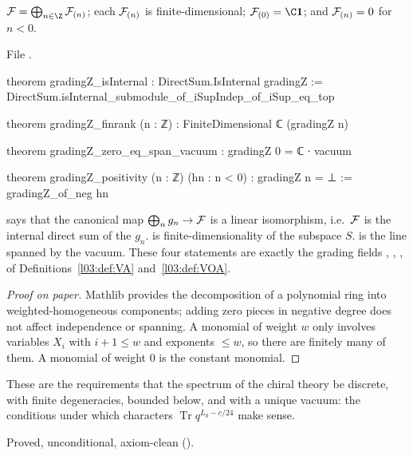 \begin{theorem}\label{l05:thm:gradingZ}
$\lfiveF=\bigoplus_{n\in\Z}\lfiveF_{(n)}$; each $\mathcal{F}_{(n)}$ is finite-dimensional;
$\lfiveF_{(0)}=\C\lfivevac$; and $\mathcal{F}_{(n)}=0$ for $n<0$.
\end{theorem}

\noindent File .
\begin{leancode}
theorem gradingZ_isInternal : DirectSum.IsInternal gradingZ :=
  DirectSum.isInternal_submodule_of_iSupIndep_of_iSup_eq_top

theorem gradingZ_finrank (n : ℤ) : FiniteDimensional ℂ (gradingZ n)

theorem gradingZ_zero_eq_span_vacuum : gradingZ 0 = ℂ ∙ vacuum

theorem gradingZ_positivity (n : ℤ) (hn : n < 0) : gradingZ n = ⊥ := gradingZ_of_neg hn
\end{leancode}

\begin{dictionary}
 says that the canonical map $\bigoplus_n g_n\to\mathcal{F}$ is a linear
isomorphism, i.e.\ $\mathcal{F}$ is the internal direct sum of the $g_n$.  is
finite-dimensionality of the subspace $S$.  is the line spanned by the vacuum. These
four statements are exactly the grading fields , , ,
 of Definitions~\ref{l03:def:VA} and~\ref{l03:def:VOA}.
\end{dictionary}

\begin{proof}[Proof on paper]
Mathlib provides the decomposition of a polynomial ring into weighted-homogeneous components; adding
zero pieces in negative degree does not affect independence or spanning. A monomial of weight $w$ only
involves variables $X_i$ with $i+1\le w$ and exponents $\le w$, so there are finitely many of them. A
monomial of weight $0$ is the constant monomial.
\end{proof}

\begin{physics}
These are the requirements that the spectrum of the chiral theory be discrete, with finite
degeneracies, bounded below, and with a unique vacuum: the conditions under which characters
$\operatorname{Tr}q^{L_0-c/24}$ make sense.
\end{physics}

\begin{status}
Proved, unconditional, axiom-clean ().
\end{status}


